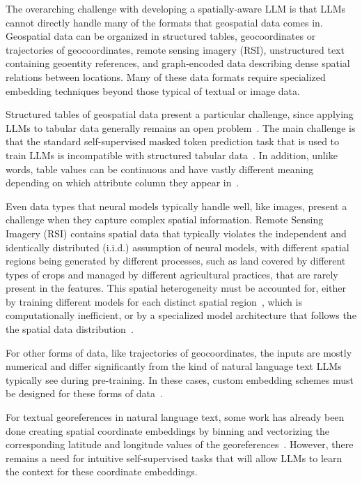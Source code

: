 The overarching challenge with developing a spatially-aware LLM is that LLMs cannot directly handle many of the formats that geospatial data comes in.
Geospatial data can be organized in structured tables, geocoordinates or trajectories of geocoordinates, remote sensing imagery (RSI), unstructured text containing geoentity references, and graph-encoded data describing dense spatial relations between locations.
%
Many of these data formats require specialized embedding techniques beyond those typical of textual or image data.


Structured tables of geospatial data present a particular challenge, since applying LLMs to tabular data generally remains an open problem~\cite{Gao2023,Cong2023}.
The main challenge is that the standard self-supervised masked token prediction task that is used to train LLMs is incompatible with structured tabular data~\cite{Tan2023, Qi2023}.
In addition, unlike words, table values can be continuous and have vastly different meaning depending on which attribute column they appear in~\cite{Qi2023}.


Even data types that neural models typically handle well, like images, present a challenge when they capture complex spatial information.
%
Remote Sensing Imagery (RSI) contains spatial data that typically violates the independent and identically distributed (i.i.d.) assumption of neural models, with different spatial regions being generated by different processes, such as land covered by different types of crops and managed by different agricultural practices, that are rarely present in the features. 
This spatial heterogeneity must be accounted for, either by training different models for each distinct spatial region~\cite{Gupta2021}, which is computationally inefficient, or by a specialized model architecture that follows the the spatial data distribution~\cite{Xie2021b}.


For other forms of data, like trajectories of geocoordinates, the inputs are mostly numerical and differ significantly from the kind of natural language text LLMs typically see during pre-training.
In these cases, custom embedding schemes must be designed for these forms of data~\cite{Hu2023}.
%
%

For textual georeferences in natural language text, some work has already been done creating spatial coordinate embeddings by binning and vectorizing the corresponding latitude and longitude values of the georeferences~\cite{Li2021}.
However, there remains a need for intuitive self-supervised tasks that will allow LLMs to learn the context for these coordinate embeddings.
%

